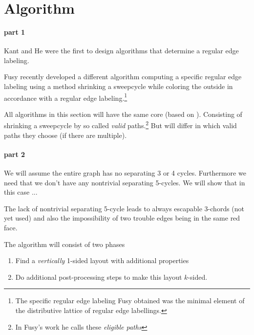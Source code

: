 
\section{Algorithm}

\label{s:algo}
\paragraph{part 1}

Kant and He \cite{Kant1997} were the first to design algorithms that determine a regular edge labeling.

Fusy \cite{Fusy2006} recently developed a different algorithm computing a specific regular edge labeling using a method shrinking a sweepcycle while coloring the outside in accordance with a regular edge labeling.\footnote{The specific regular edge labeling Fusy obtained was the minimal element of the distributive lattice of regular edge labellings.}

All algorithms in this section will have the same core (based on \cite{Fusy2006}). Consisting of shrinking a sweepcycle by so called \emph{valid} paths.\footnote{In Fusy's work he calls these \emph{eligible paths}} But will differ in which valid paths they choose (if there are multiple).


\paragraph{part 2}

We will assume the entire graph has no separating 3 or 4 cycles. Furthermore we need that we don't have any nontrivial separating 5-cycles.  We will show that in this case ...

The lack of nontrivial separating 5-cycle leads to always escapable 3-chords (not yet used) and also the impossibility of two trouble edges being in the same red face.


The algorithm will consist of two phases

\begin{enumerate}
  \item Find a \emph{vertically} 1-sided layout with additional properties
  \item Do additional post-processing steps to make this layout $k$-sided.
\end{enumerate}
